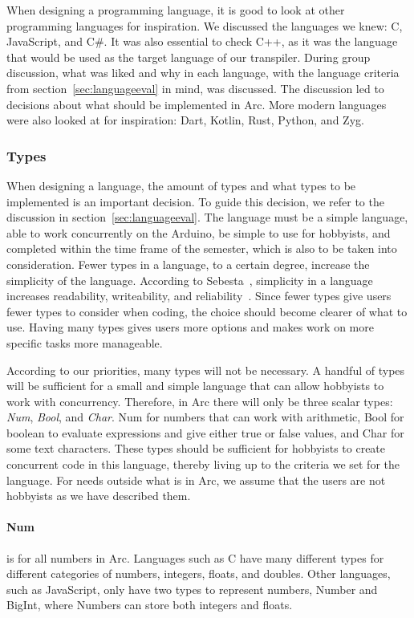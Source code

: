 When designing a programming language, it is good to look at other programming languages for inspiration. We discussed the languages we knew: C, JavaScript, and C\#. It was also essential to check C++, as it was the language that would be used as the target language of our transpiler. During group discussion, what was liked and why in each language, with the language criteria from section~\ref{sec:languageeval} in mind, was discussed. The discussion led to decisions about what should be implemented in Arc. More modern languages were also looked at for inspiration: Dart, Kotlin, Rust, Python, and Zyg.

\subsubsection{Types}
When designing a language, the amount of types and what types to be implemented is an important decision. To guide this decision, we refer to the discussion in section~\ref{sec:languageeval}. The language must be a simple language, able to work concurrently on the Arduino, be simple to use for hobbyists, and completed within the time frame of the semester, which is also to be taken into consideration. Fewer types in a language, to a certain degree, increase the simplicity of the language. According to Sebesta~\cite{Sebesta2016}, simplicity in a language increases readability, writeability, and reliability~\cite{Sebesta2016}. Since fewer types give users fewer types to consider when coding, the choice should become clearer of what to use. Having many types gives users more options and makes work on more specific tasks more manageable.

According to our priorities, many types will not be necessary. A handful of types will be sufficient for a small and simple language that can allow hobbyists to work with concurrency. Therefore, in Arc there will only be three scalar types: \textit{Num}, \textit{Bool}, and \textit{Char}. Num for numbers that can work with arithmetic, Bool for boolean to evaluate expressions and give either true or false values, and Char for some text characters. These types should be sufficient for hobbyists to create concurrent code in this language, thereby living up to the criteria we set for the language. For needs outside what is in Arc, we assume that the users are not hobbyists as we have described them.


\paragraph{Num} is for all numbers in Arc. Languages such as C have many different types for different categories of numbers, integers, floats, and doubles. Other languages, such as JavaScript, only have two types to represent numbers, Number and BigInt, where Numbers can store both integers and floats.

